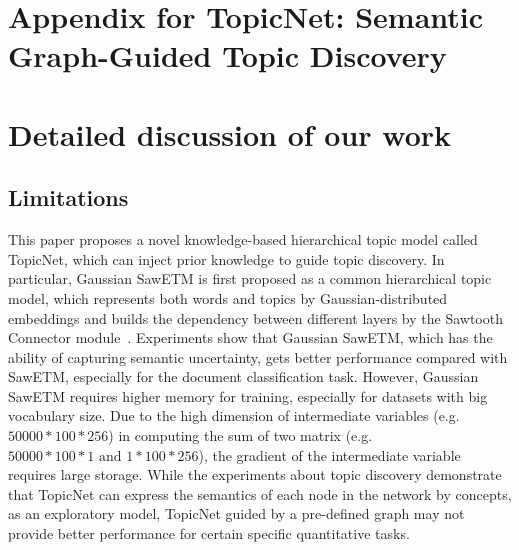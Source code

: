 \documentclass{article}
\begin{document}


\appendix

\section*{Appendix for TopicNet: Semantic Graph-Guided Topic Discovery}
\section{Detailed discussion of our work}
\subsection{Limitations}
This paper proposes a novel knowledge-based hierarchical topic model called TopicNet, which can inject prior knowledge to guide topic discovery. In particular, Gaussian SawETM is first proposed as a common hierarchical topic model, which represents both words and topics by Gaussian-distributed embeddings and builds the dependency between different layers by the Sawtooth Connector module~\cite{duan2021sawtooth}. Experiments show that Gaussian SawETM, which has the ability of capturing semantic uncertainty, gets better performance compared with SawETM, especially for the document classification task. However, Gaussian SawETM requires %
higher memory for training, especially for datasets with big vocabulary size. %
Due to the high dimension of intermediate variables (e.g. $50000 * 100 * 256 $) in computing the sum of two matrix (e.g. $50000 * 100 * 1  \text{ and }  1 * 100* 256 $),  the gradient of the intermediate variable requires large %
storage. 
While the experiments about topic discovery demonstrate that TopicNet %
can express the semantics of each node in the network by concepts, %
as an exploratory model, 
TopicNet guided by a pre-defined graph may not provide better performance for certain specific quantitative tasks. %
\end{document}
